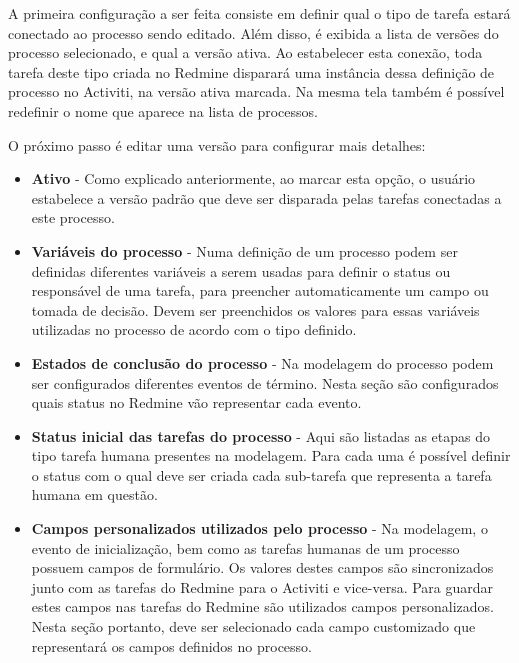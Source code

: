 A primeira configuração a ser feita consiste em definir qual o tipo de tarefa estará conectado ao processo sendo editado. Além disso, é exibida a lista de versões do processo selecionado, e qual a versão ativa. Ao estabelecer esta conexão, toda tarefa deste tipo criada no Redmine disparará uma instância dessa definição de processo no Activiti, na versão ativa marcada.
Na mesma tela também é possível redefinir o nome que aparece na lista de processos.

O próximo passo é editar uma versão para configurar mais detalhes:

\begin{itemize}
\item \textbf{Ativo} - Como explicado anteriormente, ao marcar esta opção, o usuário estabelece a versão padrão que deve ser disparada pelas tarefas conectadas a este processo.

\item \textbf{Variáveis do processo} - Numa definição de um processo podem ser definidas diferentes variáveis a serem usadas para definir o status ou responsável de uma tarefa, para preencher automaticamente um campo ou tomada de decisão. Devem ser preenchidos os valores para essas variáveis utilizadas no processo de acordo com o tipo definido.

\item \textbf{Estados de conclusão do processo} - 
Na modelagem do processo podem ser configurados diferentes eventos de término. Nesta seção são configurados quais status no Redmine vão representar cada evento.

\item \textbf{Status inicial das tarefas do processo} - 
Aqui são listadas as etapas do tipo tarefa humana presentes na modelagem. Para cada uma é possível definir o status com o qual deve ser criada cada sub-tarefa que representa a tarefa humana em questão.

\item \textbf{Campos personalizados utilizados pelo processo} - Na modelagem, o evento de inicialização, bem como as tarefas humanas de um processo possuem campos de formulário. Os valores destes campos são sincronizados junto com as tarefas do Redmine para o Activiti e vice-versa. Para guardar estes campos nas tarefas do Redmine são utilizados campos personalizados. Nesta seção portanto, deve ser selecionado cada campo customizado que representará os campos definidos no processo.


\end{itemize}


